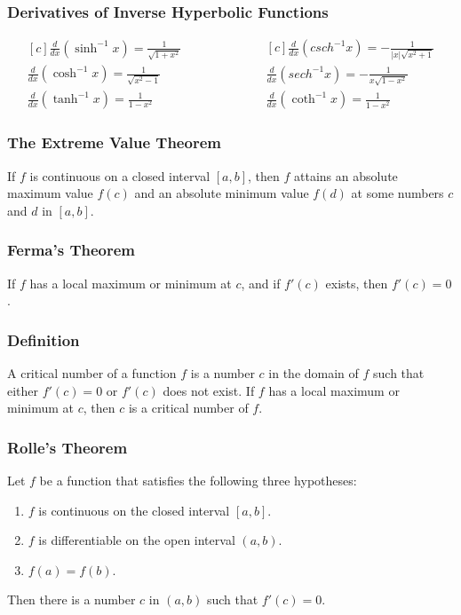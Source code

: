 \documentclass{article}
\begin{document}
\subsubsection*{Derivatives of Inverse Hyperbolic Functions}
\begin{equation*}
\begin{aligned}[c]
\frac{d}{dx}(\sinh^{-1} x) = \frac{1}{\sqrt{1+x^2}} 	\\
\frac{d}{dx}(\cosh^{-1} x) = \frac{1}{\sqrt{x^2-1}}	\\
\frac{d}{dx}(\tanh^{-1} x) = \frac{1}{1-x^2}
\end{aligned}
\qquad\qquad\qquad
\begin{aligned}[c]
\frac{d}{dx}(csch^{-1} x) = -\frac{1}{|x| \sqrt{x^2+1}} 	\\
\frac{d}{dx}(sech^{-1} x) = -\frac{1}{x \sqrt{1-x^2}}		\\
\frac{d}{dx}(\coth^{-1} x) = \frac{1}{1-x^2}
\end{aligned}
\end{equation*}

\subsubsection*{The Extreme Value Theorem}
If \(f\) is continuous on a closed interval \([a,b]\), then \(f\) attains an absolute maximum value \(f(c)\) and an absolute minimum value \(f(d)\) at some numbers \(c\) and \(d\) in \([a,b]\).

\subsubsection*{Ferma's Theorem}
If \(f\) has a local maximum or minimum at \(c\), and if \(f'(c)\) exists, then \(f'(c)=0\).

\subsubsection*{Definition}
A critical number of a function \(f\) is a number \(c\) in the domain of \(f\) such that either \(f'(c)=0\) or \(f'(c)\) does not exist.
If \(f\) has a local maximum or minimum at \(c\), then \(c\) is a critical number of \(f\).

\subsubsection*{Rolle's Theorem}
Let \(f\) be a function that satisfies the following three hypotheses:
\begin{enumerate}
  \item \(f\) is continuous on the closed interval \([a,b]\).
  \item \(f\) is differentiable on the open interval \((a,b)\).
  \item \(f(a)=f(b)\).
\end{enumerate}
Then there is a number \(c\) in \((a,b)\) such that \(f'(c)=0\).
\end{document}
